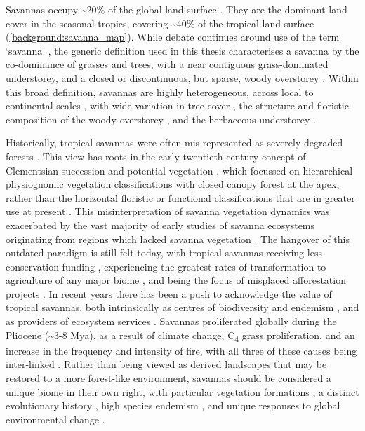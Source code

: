 \begin{refsection}
Savannas occupy \textasciitilde{}20\% of the global land surface \citep{Scholes1993}. They are the dominant land cover in the seasonal tropics, covering \textasciitilde{}40\% of the tropical land surface \citep{Scholes1997} (\autoref{background:savanna_map}). While debate continues around use of the term `savanna' \citep{Lehmann2011, Ratnam2011}, the generic definition used in this thesis characterises a savanna by the co-dominance of grasses and trees, with a near contiguous grass-dominated understorey, and a closed or discontinuous, but sparse, woody overstorey \citep{Scholes1997, Bond2008}. Within this broad definition, savannas are highly heterogeneous, across local to continental scales \citep{Bucini2007}, with wide variation in tree cover \citep{Sankaran2005, Hirota2011}, the structure and floristic composition of the woody overstorey \citep{Fayolle2018, Solbrig1996}, and the herbaceous understorey \citep{Siebert2019, Coller2018}.

Historically, tropical savannas were often mis-represented as severely degraded forests \citep{Veldman2016}. This view has roots in the early twentieth century concept of Clementsian succession and potential vegetation \citep{Clements1916, Pulsford2014}, which focussed on hierarchical physiognomic vegetation classifications with closed canopy forest at the apex, rather than the horizontal floristic or functional classifications that are in greater use at present \citep{Aleman2020}. This misinterpretation of savanna vegetation dynamics was exacerbated by the vast majority of early studies of savanna ecosystems originating from regions which lacked savanna vegetation \citep{Fairhead1996}. The hangover of this outdated paradigm is still felt today, with tropical savannas receiving less conservation funding \citep{Watson2016}, experiencing the greatest rates of transformation to agriculture of any major biome \citep{Hoekstra2004, Parr2014}, and being the focus of misplaced afforestation projects \citep{Silveira2020, Kumar2020, Laestadius2011}. In recent years there has been a push to acknowledge the value of tropical savannas, both intrinsically as centres of biodiversity and endemism \citep{Kumar2020, Pennington2018}, and as providers of ecosystem services \citep{Ryan2016}. Savannas proliferated globally during the Pliocene (\textasciitilde{}3-8 Mya), as a result of climate change, C\textsubscript{4} grass proliferation, and an increase in the frequency and intensity of fire, with all three of these causes being inter-linked \citep{Cerling1997, Beerling2006, Osborne2007, Edwards2010}. Rather than being viewed as derived landscapes that may be restored to a more forest-like environment, savannas should be considered a unique biome in their own right, with particular vegetation formations \citep{Torello2013}, a distinct evolutionary history \citep{Veldman2015}, high species endemism \citep{Pennington2006, Huntley1982}, and unique responses to global environmental change \citep{Sankaran2019}.


\end{refsection}
